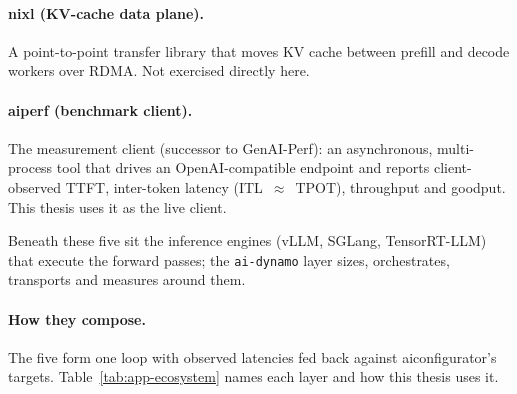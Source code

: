 \paragraph{nixl (KV-cache data plane).} A point-to-point transfer library that
moves KV cache between prefill and decode workers over RDMA. Not exercised
directly here.

\paragraph{aiperf (benchmark client).} The measurement client (successor to
GenAI-Perf): an asynchronous, multi-process tool that drives an
OpenAI-compatible endpoint and reports client-observed TTFT, inter-token latency
(ITL~$\approx$~TPOT), throughput and goodput. This thesis uses it as the live
client.

Beneath these five sit the inference engines (vLLM, SGLang, TensorRT-LLM) that
execute the forward passes; the \texttt{ai-dynamo} layer sizes, orchestrates,
transports and measures around them.

\paragraph{How they compose.} The five form one loop with observed latencies fed
back against aiconfigurator's targets. Table~\ref{tab:app-ecosystem} names each
layer and how this thesis uses it.


